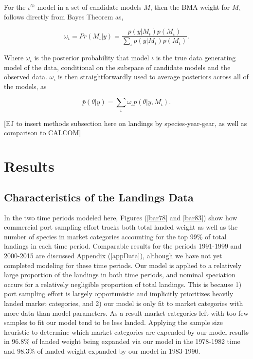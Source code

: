 \documentclass[12pt]{article}
\begin{document}
For the \(\iota^{th}\) model in a set of candidate models \(M\), then
the BMA weight for \(M_\iota\) follows directly from Bayes Theorem as,

\[\omega_\iota = Pr(M_\iota|y) = \frac{ p(y|M_\iota)p(M_\iota) }{ \sum_\iota p(y|M_\iota)p(M_\iota) }.\]

Where \(\omega_\iota\) is the posterior probability that model \(\iota\)
is the true data generating model of the data, conditional on the
subspace of candidate models and the observed data. \(\omega_\iota\) is
then straightforwardly used to average posteriors across all of the
models, as

\[\bar p(\theta|y) = \sum_{\iota} \omega_\iota p(\theta|y, M_\iota).\]

[EJ to insert methods subsection here on landings by species-year-gear, as 
well as comparison to CALCOM]

%
%
\section{Results}\label{results}
%
%

\subsection{Characteristics of the Landings Data}\label{landData}

In the two time periods modeled here, Figures (\ref{bar78} and \ref{bar83}) 
show how commercial port sampling effort tracks both total landed weight as
well as the number of species in market categories accounting for the
top 99\% of total landings in each time period. Comparable results for
the periods 1991-1999 and 2000-2015 are discussed Appendix (\ref{appData}), 
although we have not yet completed modeling for these time periods. 
Our model is applied to a relatively large proportion of the landings in both 
time periods, and nominal speciation occurs for a relatively negligible 
proportion of total landings. %
This is because 1) port sampling effort is largely opportunistic and implicitly 
prioritizes heavily landed market categories, and 2) our model is only fit to 
market categories with more data than model parameters. As a result market 
categories left with too few samples to fit our model tend to be less landed. 
Applying the sample size heuristic to determine which market categories are 
expended by our model results in 96.8\% of landed weight being expanded via 
our model in the 1978-1982 time and 98.3\% of landed weight expanded by our 
model in 1983-1990.
\end{document}
